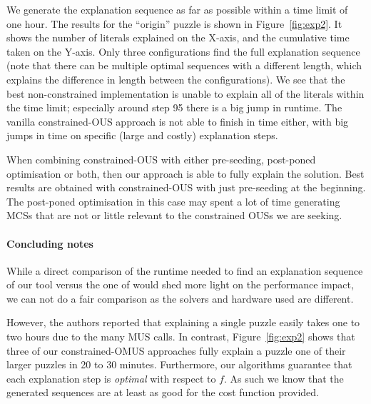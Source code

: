 
We generate the explanation sequence as far as possible within a time limit of one hour. 
The results for the  ``origin'' puzzle is shown in Figure~\ref{fig:exp2}.
It shows the number of literals explained on the X-axis, and the cumulative time taken on the Y-axis. 
Only three configurations find the full explanation sequence (note that there can be multiple optimal sequences with a different length, which explains the difference in length between the configurations).
We  see that the best non-constrained implementation is unable to explain all of the literals within the time limit; especially around step 95 there is a big jump in runtime. The vanilla constrained-OUS approach is not able to finish in time either, with big jumps in time on specific (large and costly) explanation steps.

When combining constrained-OUS with either pre-seeding, post-poned optimisation or both, then our approach is able to fully explain the solution. Best results are obtained with constrained-OUS with just pre-seeding at the beginning. The post-poned optimisation in this case may spent a lot of time generating MCSs that are not or little relevant to the constrained OUSs we are seeking. 

\paragraph{Concluding notes}
While a direct comparison of the runtime needed to find an explanation sequence of our tool versus the one of \citet{ecai/BogaertsGCG20} %
would shed more light on the performance impact, we can not do a fair comparison as the solvers and hardware used are different.

However, the authors reported that explaining a single puzzle easily takes one to two hours due to the many MUS calls. In contrast, Figure~\ref{fig:exp2} shows that three of our constrained-OMUS approaches fully explain a puzzle one of their larger puzzles in 20 to 30 minutes.
Furthermore, our algorithms guarantee that each explanation step is \emph{optimal} with respect to $f$. As such we know that the generated sequences are at least as good for the cost function provided.

